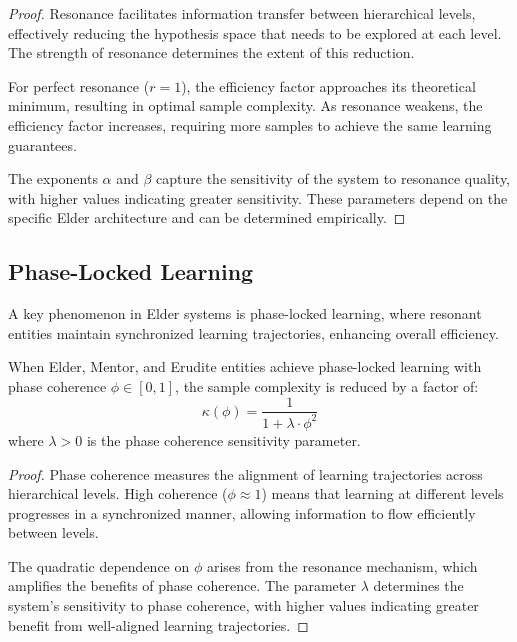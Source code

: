 \begin{proof}
Resonance facilitates information transfer between hierarchical levels, effectively reducing the hypothesis space that needs to be explored at each level. The strength of resonance determines the extent of this reduction.

For perfect resonance ($r = 1$), the efficiency factor approaches its theoretical minimum, resulting in optimal sample complexity. As resonance weakens, the efficiency factor increases, requiring more samples to achieve the same learning guarantees.

The exponents $\alpha$ and $\beta$ capture the sensitivity of the system to resonance quality, with higher values indicating greater sensitivity. These parameters depend on the specific Elder architecture and can be determined empirically.
\end{proof}

\subsection{Phase-Locked Learning}

A key phenomenon in Elder systems is phase-locked learning, where resonant entities maintain synchronized learning trajectories, enhancing overall efficiency.

\begin{theorem}
When Elder, Mentor, and Erudite entities achieve phase-locked learning with phase coherence $\phi \in [0, 1]$, the sample complexity is reduced by a factor of:
\begin{equation}
\kappa(\phi) = \frac{1}{1 + \lambda \cdot \phi^2}
\end{equation}
where $\lambda > 0$ is the phase coherence sensitivity parameter.
\end{theorem}

\begin{proof}
Phase coherence measures the alignment of learning trajectories across hierarchical levels. High coherence ($\phi \approx 1$) means that learning at different levels progresses in a synchronized manner, allowing information to flow efficiently between levels.

The quadratic dependence on $\phi$ arises from the resonance mechanism, which amplifies the benefits of phase coherence. The parameter $\lambda$ determines the system's sensitivity to phase coherence, with higher values indicating greater benefit from well-aligned learning trajectories.
\end{proof}


